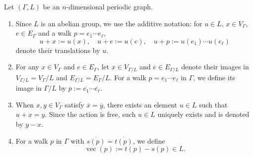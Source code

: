 \documentclass[11pt]{article}
\theoremstyle{definition}
\numberwithin{equation}{section}
\begin{document}
\begin{defn}\label{defi:peri}
Let $(\Gamma,L)$ be an $n$-dimensional periodic graph.
\begin{enumerate}
\item Since $L$ is an abelian group, we use the additive notation: 
for $u \in L$, $x \in V_{\Gamma}$, $e \in E_{\Gamma}$ and a walk $p = e_1 \cdots e_{\ell}$,
\[
u+x := u(x), \quad u+e := u(e), \quad u+p := u(e_1) \cdots u(e_{\ell})
\]
denote their translations by $u$. 

\item 
For any $x \in V_{\Gamma}$ and $e \in E_{\Gamma}$, 
let $\overline{x} \in V_{\Gamma /L}$ and $\overline{e} \in E_{\Gamma /L}$ denote their images in 
$V_{\Gamma /L} = V_{\Gamma} /L$ and $E_{\Gamma /L} = E_{\Gamma} /L$. 
For a walk $p = e_1 \cdots e_{\ell}$ in $\Gamma$, we define its image in $\Gamma /L$ by $\overline{p} := \overline{e_1} \cdots \overline{e_{\ell}}$. 

\item 
When $x, y \in V_{\Gamma}$ satisfy $\overline{x} = \overline{y}$, there exists an element $u \in L$ such that $u + x = y$. 
Since the action is free, such $u \in L$ uniquely exists and is denoted by $y - x$. 

\item 
For a walk $p$ in $\Gamma$ with $\overline{s(p)} = \overline{t(p)}$, we define 
\[
\operatorname{vec}(p) := t(p) - s(p) \in L. 
\]
\end{enumerate}
\end{defn}
\end{document}
